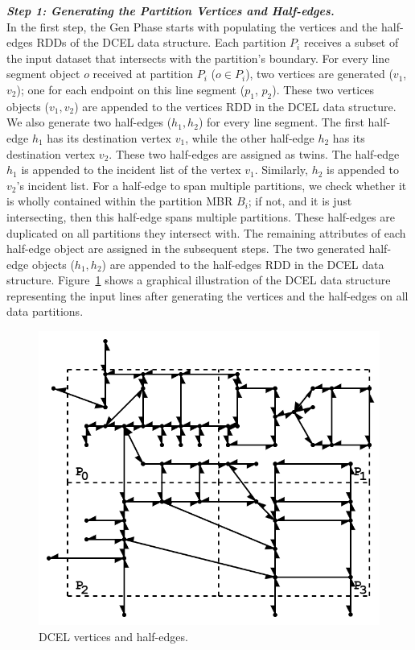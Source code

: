 \vspace{4pt}
\textit{\textbf{Step 1: Generating the Partition Vertices and Half-edges.}}
\\
In the first step, the Gen Phase starts with populating the vertices and the half-edges RDDs of the DCEL data structure.
Each partition $P_i$ receives a subset of the input dataset that intersects with the partition's boundary.
For every line segment object $o$ received at partition $P_i$ ($o \in P_i$), two vertices are generated ($v_1$, $v_2$); one for each endpoint on this line segment ($p_1$, $p_2$). These two vertices objects ($v_1, v_2$) are appended to the vertices RDD in the DCEL data structure.
We also generate two half-edges ($h_1, h_2$) for every line segment. 
The first half-edge $h_1$ has its destination vertex $v_1$, while the other half-edge $h_2$ has its destination vertex $v_2$. These two half-edges are assigned as twins.
The half-edge $h_1$ is appended to the incident list of the vertex $v_1$. Similarly, $h_2$ is appended to $v_2$'s incident list.
For a half-edge to span multiple partitions, we check whether it is wholly contained within the partition MBR $B_i$; if not, and it is just intersecting, then this half-edge spans multiple partitions. 
These half-edges are duplicated on all partitions they intersect with.
The remaining attributes of each half-edge object are assigned in the subsequent steps. 
The two generated half-edge objects ($h_1, h_2$) are appended to the half-edges RDD in the DCEL data structure.
Figure~\ref{fig:ddcel:step1} shows a graphical illustration of the DCEL data structure representing the input lines after generating the vertices and the half-edges on all data partitions.


\begin{figure}[tb]
	\centering
	\includegraphics[width=0.75 \linewidth ]{model/ddcel-1.png}
	\caption[caption]{DCEL vertices and half-edges.}
	\label{fig:ddcel:step1}
\end{figure}


